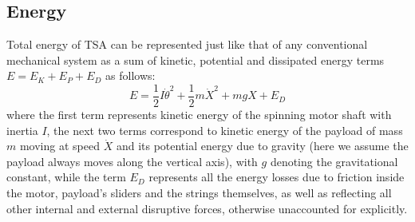 \subsection{Energy}
Total energy of TSA can be represented just like that of any conventional mechanical system as a sum of kinetic, potential and dissipated energy terms $E = E_K + E_P + E_D$ as follows:
\begin{equation}\label{eq.mod:total_energy}
    E = \frac{1}{2} I\dot{\theta}^2 + \frac{1}{2}m \dot{X}^2 + mgX + E_D
\end{equation}
where the first term represents kinetic energy of the spinning motor shaft with inertia $I$, the next two terms correspond to kinetic energy of the payload of mass $m$ moving at speed $\dot{X}$ and its potential energy due to gravity (here we assume the payload always moves along the vertical axis), with $g$ denoting the gravitational constant, while the term $E_D$ represents all the energy losses due to friction inside the motor, payload's sliders and the strings themselves, as well as reflecting all other internal and external disruptive forces, otherwise unaccounted for explicitly.


